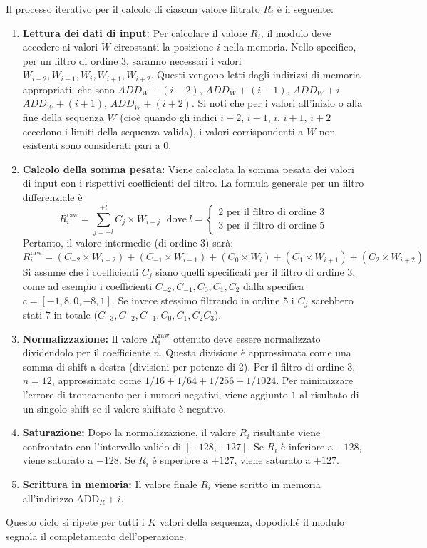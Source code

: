 \documentclass{article}
\begin{document}
Il processo iterativo per il calcolo di ciascun valore filtrato $R_i$ è il seguente:
\begin{enumerate}
    \item \textbf{Lettura dei dati di input:} Per calcolare il valore $R_i$, il modulo deve accedere ai valori $W$ circostanti la posizione $i$ nella memoria. Nello specifico, per un filtro di ordine 3, saranno necessari i valori $W_{i-2}, W_{i-1}, W_i, W_{i+1}, W_{i+2}$. Questi vengono letti dagli indirizzi di memoria appropriati, che sono $ADD_W + (i-2)$, $ADD_W + (i-1)$, $ADD_W + i$ $ADD_W + (i+1)$, $ADD_W + (i+2)$. Si noti che per i valori all'inizio o alla fine della sequenza $W$ (cioè quando gli indici $i-2$, $i-1$, $i$, $i+1$, $i+2$ eccedono i limiti della sequenza valida), i valori corrispondenti a $W$ non esistenti sono considerati pari a $0$.
    
    \item \textbf{Calcolo della somma pesata:} Viene calcolata la somma pesata dei valori di input con i rispettivi coefficienti del filtro. La formula generale per un filtro differenziale è 
    $$R_i^\text{raw} = \sum_{j=-l}^{+l} C_j \times W_{i+j}\ \ \, \text{dove}\ l= \left\{ \begin{array}{cl} 2 \text{ per il filtro di ordine 3} \\ 3 \text{ per il filtro di ordine 5} \end{array} \right.$$
    Pertanto, il valore intermedio (di ordine $3$) sarà:
    $$R_i^\text{raw} = (C_{-2} \times W_{i-2}) + (C_{-1} \times W_{i-1}) + (C_{0} \times W_{i}) + (C_1 \times W_{i+1}) + (C_2 \times W_{i+2})$$
    Si assume che i coefficienti $C_j$ siano quelli specificati per il filtro di ordine 3, come ad esempio i coefficienti $C_{-2}, C_{-1}, C_0, C_1, C_2$ dalla specifica $c=[-1, 8, 0, -8, 1]$. Se invece stessimo filtrando in ordine $5$ i $C_j$ sarebbero stati $7$ in totale ($C_{-3}, C_{-2}, C_{-1}, C_0, C_1, C_2 C_3$).
    
    \item \textbf{Normalizzazione:} Il valore $R_i^\text{raw}$ ottenuto deve essere normalizzato dividendolo per il coefficiente $n$. Questa divisione è approssimata come una somma di shift a destra (divisioni per potenze di 2). Per il filtro di ordine 3, $n=12$, approssimato come $1/16+1/64+1/256+1/1024$. Per minimizzare l'errore di troncamento per i numeri negativi, viene aggiunto $1$ al risultato di un singolo shift se il valore shiftato è negativo.
    \item \textbf{Saturazione:} Dopo la normalizzazione, il valore $R_i$ risultante viene confrontato con l'intervallo valido di $[-128, +127]$. Se $R_i$ è inferiore a $-128$, viene saturato a $-128$. Se $R_i$ è superiore a $+127$, viene saturato a $+127$.
    \item \textbf{Scrittura in memoria:} Il valore finale $R_i$ viene scritto in memoria all'indirizzo $\text{ADD}_R + i$.
\end{enumerate}
Questo ciclo si ripete per tutti i $K$ valori della sequenza, dopodiché il modulo segnala il completamento dell'operazione.
\end{document}

